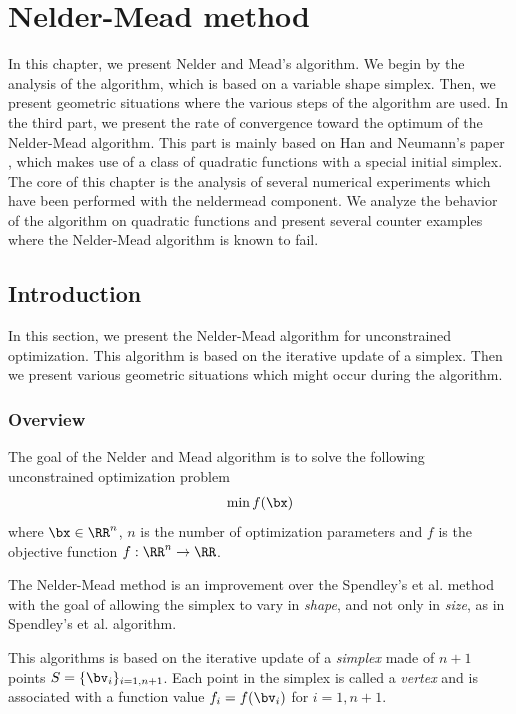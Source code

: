\chapter{Nelder-Mead method}


In this chapter, we present Nelder and Mead's \cite{citeulike:3009487} algorithm.
We begin by the analysis of the algorithm, which is based on a variable shape simplex.
Then, we present geometric situations where the various steps of the algorithm 
are used. In the third part, we present the rate of convergence toward the optimum of 
the Nelder-Mead algorithm. This part is mainly based on Han and Neumann's paper \cite{HanNeumann2006}, 
which makes use of a class of quadratic functions with a special initial 
simplex. The core of this chapter is the analysis of several numerical 
experiments which have been performed with the neldermead component.
We analyze the behavior of the algorithm on quadratic functions and 
present several counter examples where the Nelder-Mead algorithm is 
known to fail.

\section{Introduction}

In this section, we present the Nelder-Mead algorithm for unconstrained optimization.
This algorithm is based on the iterative update of a simplex. 
Then we present various geometric situations which might occur
during the algorithm. 

\subsection{Overview}

The goal of the Nelder and Mead algorithm is to solve the 
following unconstrained optimization problem
\begin{eqnarray}
\min f(\bx)
\end{eqnarray}
where $\bx\in \RR^n$, $n$ is the number of optimization parameters and $f$ is the objective 
function $f:\RR^n\rightarrow \RR$.

The Nelder-Mead method is an improvement over the Spendley's et al.
method with the goal of allowing the simplex to vary in \emph{shape}, 
and not only in \emph{size}, as in Spendley's et al. algorithm.

This algorithms is based on the iterative update of 
a \emph{simplex} made of $n+1$ points $S=\{\bv_i\}_{i=1,n+1}$. Each point 
in the simplex is called a \emph{vertex} and is associated with 
a function value $f_i=f(\bv_i)$ for $i=1,n+1$.

